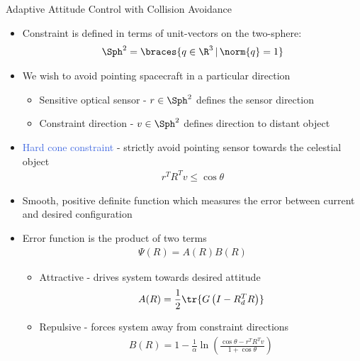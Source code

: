 \documentclass[final, usenames, dvipsnames]{beamer}
\newlength{\twocolwidth}
\def\Emph{\textcolor{RoyalBlue}}
\begin{document}
\begin{frame}[t]
\begin{columns}[T,onlytextwidth]
\begin{column}{\twocolwidth}
\begin{block}{Adaptive Attitude Control with Collision Avoidance} %
	\begin{minipage}{0.5\columnwidth} %
	\begin{itemize}
		\item Constraint is defined in terms of unit-vectors on the two-sphere:
			\begin{align*}
				\Sph^2 = \braces{q \in \R^3 \,  \vert \, \norm{q} = 1 }
			\end{align*}
		\item We wish to avoid pointing spacecraft in a particular direction
			\begin{itemize}
				\item Sensitive optical sensor - \( r \in \Sph^2 \) defines the sensor direction
				\item Constraint direction - \( v \in \Sph^2 \) defines direction to distant object
			\end{itemize}
		\item \Emph{Hard cone constraint} - strictly avoid pointing sensor towards the celestial object
			\begin{align*}
				r^T R^T v \leq \cos \theta
			\end{align*}
	\end{itemize}
	\end{minipage}%
	\begin{minipage}{0.5\columnwidth}%
		\begin{itemize}
			\item Smooth, positive definite function which measures the error between current and desired configuration
			\item Error function is the product of two terms
				\begin{align*}
					\Psi(R) = A(R) B(R) 
				\end{align*}
				\begin{itemize}
					\item Attractive - drives system towards desired attitude
						\begin{align*}
							A(R) = \frac{1}{2} \tr{G \left( I - R_d^T R\right)}
						\end{align*}
					\item Repulsive - forces system away from constraint directions
						\begin{align*}
							B(R) = 1 - \frac{1}{\alpha} \ln \left( \frac{\cos \theta -  r^T R^T v}{1 + \cos \theta}\right)
						\end{align*}
				\end{itemize}
		\end{itemize}
	\end{minipage}%
	

\end{block}
\end{column}
\end{columns}
\end{frame}
\end{document}
